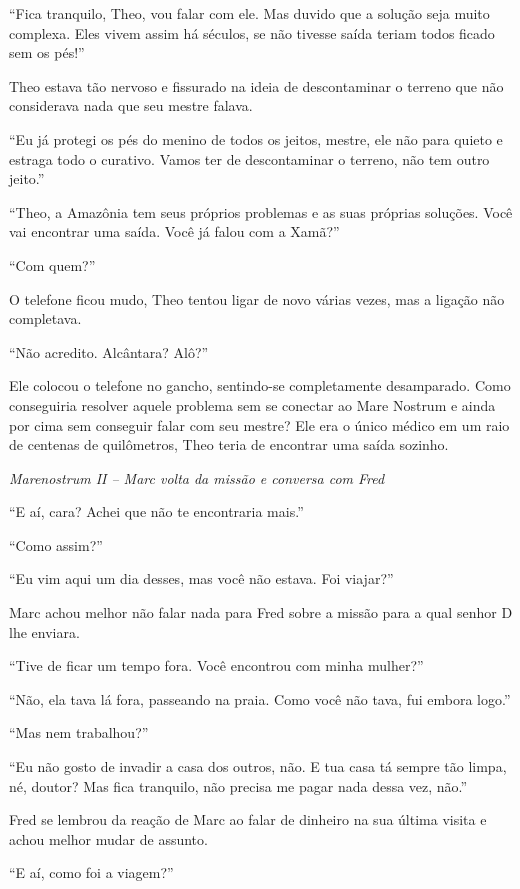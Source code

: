 ``Fica tranquilo, Theo, vou falar com ele. Mas duvido que a solução seja
muito complexa. Eles vivem assim há séculos, se não tivesse saída teriam
todos ficado sem os pés!''

Theo estava tão nervoso e fissurado na ideia de descontaminar o terreno
que não considerava nada que seu mestre falava.

``Eu já protegi os pés do menino de todos os jeitos, mestre, ele não
para quieto e estraga todo o curativo. Vamos ter de descontaminar o
terreno, não tem outro jeito.''

``Theo, a Amazônia tem seus próprios problemas e as suas próprias
soluções. Você vai encontrar uma saída. Você já falou com a Xamã?''

``Com quem?''

O telefone ficou mudo, Theo tentou ligar de novo várias vezes, mas a
ligação não completava.

``Não acredito. Alcântara? Alô?''

Ele colocou o telefone no gancho, sentindo-se completamente desamparado.
Como conseguiria resolver aquele problema sem se conectar ao Mare
Nostrum e ainda por cima sem conseguir falar com seu mestre? Ele era o
único médico em um raio de centenas de quilômetros, Theo teria de
encontrar uma saída sozinho.

\asterisc

\emph{Marenostrum II -- Marc volta da missão e conversa com Fred}

``E aí, cara? Achei que não te encontraria mais.''

``Como assim?''

``Eu vim aqui um dia desses, mas você não estava. Foi viajar?''

Marc achou melhor não falar nada para Fred sobre a missão para a qual
senhor D lhe enviara.

``Tive de ficar um tempo fora. Você encontrou com minha mulher?''

``Não, ela tava lá fora, passeando na praia. Como você não tava, fui
embora logo.''

``Mas nem trabalhou?''

``Eu não gosto de invadir a casa dos outros, não. E tua casa tá sempre
tão limpa, né, doutor? Mas fica tranquilo, não precisa me pagar nada
dessa vez, não.''

Fred se lembrou da reação de Marc ao falar de dinheiro na sua última
visita e achou melhor mudar de assunto.

``E aí, como foi a viagem?''

